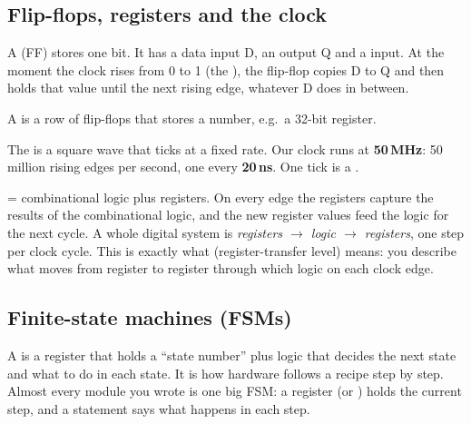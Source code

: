\documentclass[11pt]{article}
\newcommand{\mods}[1]{\texttt{\detokenize{#1}}}   %
\begin{document}
\subsection{Flip-flops, registers and the clock}
A  (FF) stores one bit. It has a data input D, an output Q and a  input. At the moment the clock rises from 0 to 1 (the ), the flip-flop copies D to Q and then holds that value until the next rising edge, whatever D does in between.

A  is a row of flip-flops that stores a number, e.g.\ a 32-bit register.

The  is a square wave that ticks at a fixed rate. Our clock runs at \textbf{50\,MHz}: 50 million rising edges per second, one every \textbf{20\,ns}. One tick is a .

\begin{center}
\end{center}

 = combinational logic plus registers. On every edge the registers capture the results of the combinational logic, and the new register values feed the logic for the next cycle. A whole digital system is \emph{registers $\to$ logic $\to$ registers}, one step per clock cycle. This is exactly what  (register-transfer level) means: you describe what moves from register to register through which logic on each clock edge.

\subsection{Finite-state machines (FSMs)}
A  is a register that holds a ``state number'' plus logic that decides the next state and what to do in each state. It is how hardware follows a recipe step by step. Almost every module you wrote is one big FSM: a register \mods{s} (or \mods{st}) holds the current step, and a \mods{case} statement says what happens in each step.
\end{document}
